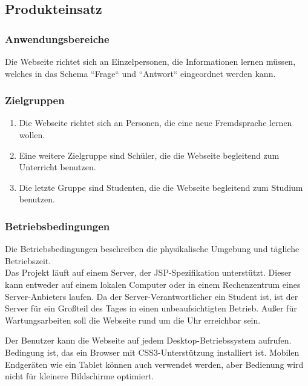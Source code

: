 \newpage
\subsection{Produkteinsatz}

\subsubsection{Anwendungsbereiche}
Die Webseite richtet sich an Einzelpersonen, die Informationen lernen müssen, welches in das Schema ``Frage`` und ``Antwort`` eingeordnet werden kann.

\subsubsection{Zielgruppen}
\begin{enumerate}[leftmargin=2cm, label=\bfseries /ZG\arabic*0/]
	\item Die Webseite richtet sich an Personen, die eine neue Fremdsprache lernen wollen.
	\item Eine weitere Zielgruppe sind Schüler, die die Webseite begleitend zum Unterricht benutzen.
	\item Die letzte Gruppe sind Studenten, die die Webseite begleitend zum Studium benutzen.
\end{enumerate}


\subsubsection{Betriebsbedingungen}
Die Betriebsbedingungen beschreiben die physikalische Umgebung und tägliche Betriebszeit.\\

\noindent Das Projekt läuft auf einem Server, der JSP-Spezifikation unterstützt. Dieser kann entweder auf einem lokalen Computer oder in einem Rechenzentrum eines Server-Anbieters laufen. Da der Server-Verantwortlicher ein Student ist, ist der Server für ein Großteil des Tages in einen unbeaufsichtigten Betrieb. Außer für Wartungsarbeiten soll die Webseite rund um die Uhr erreichbar sein.

Der Benutzer kann die Webseite auf jedem Desktop-Betriebssystem aufrufen. Bedingung ist, das ein Browser mit CSS3-Unterstützung installiert ist. Mobilen Endgeräten wie ein Tablet können auch verwendet werden, aber Bedienung wird nicht für kleinere Bildschirme optimiert.


